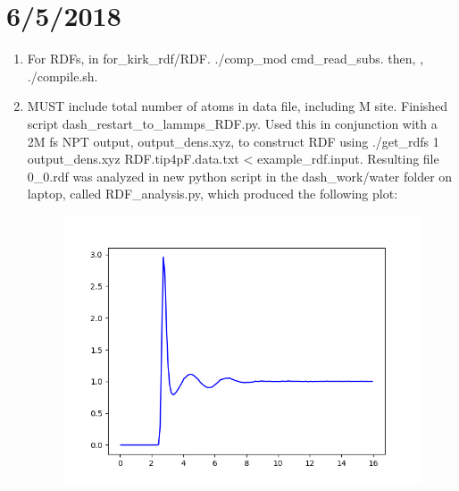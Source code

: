 \documentclass[12pt,reqno]{amsart}
\numberwithin{equation}{section}
\begin{document}
\section{6/5/2018}
\begin{enumerate}
\item For RDFs, in for\_kirk\_rdf/RDF.  ./comp\_mod cmd\_read\_subs.  then, , ./compile.sh.  
\item MUST include total number of atoms in data file, including M site.  Finished script dash\_restart\_to\_lammps\_RDF.py.  Used this in conjunction with a 2M fs NPT output, output\_dens.xyz, to construct RDF using ./get\_rdfs 1 output\_dens.xyz RDF.tip4pF.data.txt < example\_rdf.input.  Resulting file 0\_0.rdf was analyzed in new python script in the dash\_work/water folder on laptop, called RDF\_analysis.py, which produced the following plot:
\begin{figure}[H]
\centering
\includegraphics[scale=0.6]{RDF}
\end{figure}
\end{enumerate}
\end{document}
